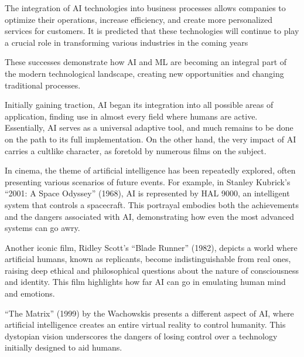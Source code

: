 \documentclass[a4paper,12pt,english]{sphinxmanual}
\begin{document}
\sphinxAtStartPar
{}

\sphinxAtStartPar
The integration of AI technologies into business processes allows
companies to optimize their operations, increase efficiency, and create
more personalized services for customers. It is predicted that these
technologies will continue to play a crucial role in transforming
various industries in the coming years %
\begin{footnote}[8]\sphinxAtStartFootnote
{}
%
\end{footnote}

\sphinxAtStartPar
These successes demonstrate how AI and ML are becoming an integral part
of the modern technological landscape, creating new opportunities and
changing traditional processes.

\sphinxAtStartPar
Initially gaining traction, AI began its integration into all possible
areas of application, finding use in almost every field where humans are
active. Essentially, AI serves as a universal adaptive tool, and much
remains to be done on the path to its full implementation. On the other
hand, the very impact of AI carries a cult\sphinxhyphen{}like character, as foretold
by numerous films on the subject.

\sphinxAtStartPar
{}

\sphinxAtStartPar
In cinema, the theme of artificial intelligence has been repeatedly
explored, often presenting various scenarios of future events. For
example, in Stanley Kubrick’s “2001: A Space Odyssey” (1968), AI is
represented by HAL 9000, an intelligent system that controls a
spacecraft. This portrayal embodies both the achievements and the
dangers associated with AI, demonstrating how even the most advanced
systems can go awry.

\sphinxAtStartPar
Another iconic film, Ridley Scott’s “Blade Runner” (1982), depicts a
world where artificial humans, known as replicants, become
indistinguishable from real ones, raising deep ethical and philosophical
questions about the nature of consciousness and identity. This film
highlights how far AI can go in emulating human mind and emotions.

\sphinxAtStartPar
“The Matrix” (1999) by the Wachowskis presents a different aspect of AI,
where artificial intelligence creates an entire virtual reality to
control humanity. This dystopian vision underscores the dangers of
losing control over a technology initially designed to aid humans.
\end{document}
